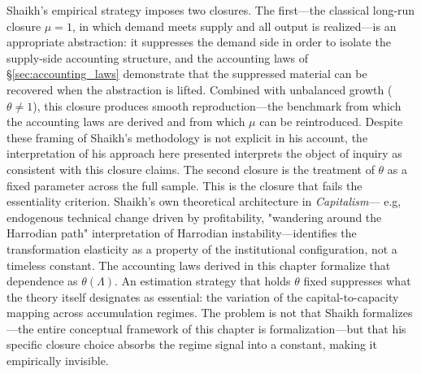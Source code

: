 Shaikh's empirical strategy imposes two closures. The first---the classical long-run closure $\mu = 1$, in which demand meets supply and all output is realized---is an appropriate abstraction: it suppresses the demand side in order to isolate the supply-side accounting structure, and the accounting laws of \S\ref{sec:accounting_laws} demonstrate that the suppressed material can be recovered when the abstraction is lifted. Combined with unbalanced growth ($\theta \neq 1$), this closure produces smooth reproduction---the benchmark from which the accounting laws are derived and from which $\mu$ can be reintroduced. Despite these framing of Shaikh's methodology is not explicit in his account, the interpretation of his approach here presented interprets the object of inquiry as consistent with this closure claims. The second closure is the treatment of $\theta$ as a fixed parameter across the full sample. This is the closure that fails the essentiality criterion. Shaikh's own theoretical architecture in \emph{Capitalism}--- e.g, endogenous technical change driven by profitability, "wandering around the Harrodian path" interpretation of Harrodian instability---identifies the transformation elasticity as a property of the institutional configuration, not a timeless constant. The accounting laws derived in this chapter formalize that dependence as $\theta(\Lambda)$. An estimation strategy that holds $\theta$ fixed suppresses what the theory itself designates as essential: the variation of the capital-to-capacity mapping across accumulation regimes. The problem is not that Shaikh formalizes---the entire conceptual framework of this chapter is formalization---but that his specific closure choice absorbs the regime signal into a constant, making it empirically invisible.




